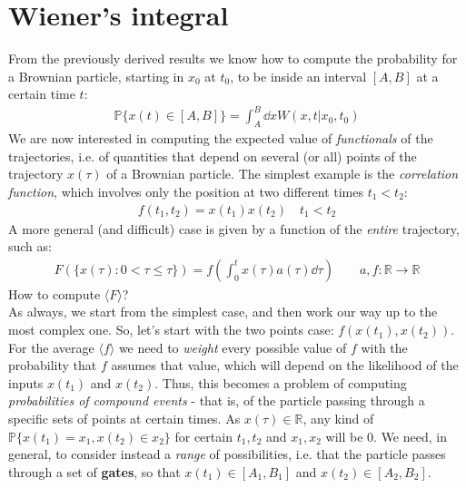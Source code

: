 \documentclass[../template.tex]{subfiles}
\begin{document}
\section{Wiener's integral}
From the previously derived results we know how to compute the probability for a Brownian particle, starting in $x_0 $ at $t_0$, to be inside an interval $[A,B]$ at a certain time $t$:
\begin{align*}
    \mathbb{P}\{x(t) \in [A,B]\} = \int_A^B \dd{x} W(x,t|x_0, t_0)
\end{align*}
We are now interested in computing the expected value of \textit{functionals} of the trajectories, i.e. of quantities that depend on several (or all) points of the trajectory $x(\tau)$ of a Brownian particle. The simplest example is the \textit{correlation function}, which involves only the position at two different times $t_1 < t_2$:
\begin{align*}
    f(t_1, t_2) = x(t_1) x(t_2) \quad t_1 < t_2
\end{align*} 
A more general (and difficult) case is given by a function of the \textit{entire} trajectory, such as:
\begin{align*}
    F(\{x(\tau)\colon 0 < \tau \leq \tau\}) = f\left(\int_0^t x(\tau) a(\tau) \dd{\tau}\right)\qquad a,f\colon \mathbb{R} \to \mathbb{R}
\end{align*}
How to compute $\langle F \rangle$?\\

As always, we start from the simplest case, and then work our way up to the most complex one. So, let's start with the two points case: $f(x(t_1), x(t_2))$. For the average $\langle f \rangle$ we need to \textit{weight} every possible value of $f$ with the probability that $f$ assumes that value, which will depend on the likelihood of the inputs $x(t_1)$ and $x(t_2)$. Thus, this becomes a problem of computing \textit{probabilities of compound events} - that is, of the particle passing through a specific sets of points at certain times. As $x(\tau) \in \mathbb{R}$, any kind of $\mathbb{P}\{x(t_1) = x_1, x(t_2) \in x_2\}$ for certain $t_1, t_2$ and $x_1, x_2$ will be $0$. We need, in general, to consider instead a \textit{range} of possibilities, i.e. that the particle passes through a set of \textbf{gates}, so that $x(t_1) \in [A_1, B_1]$ and $x(t_2) \in [A_2, B_2]$.\\
\end{document}
